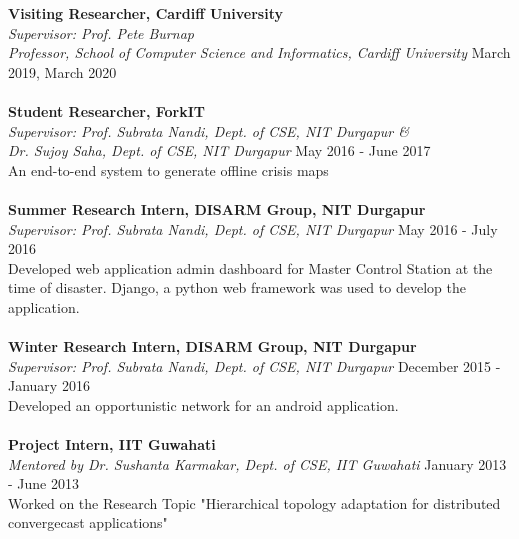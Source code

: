 \documentclass[margin, centered]{res}
\begin{document}
\begin{resume}
\textbf{Visiting Researcher, Cardiff University} \\
\emph{Supervisor: Prof. Pete Burnap \\ Professor, School of Computer Science and Informatics, Cardiff University} \hfill March 2019,  March 2020 \\
\\
\textbf{Student Researcher, ForkIT} \\
\emph{Supervisor: {Prof. Subrata Nandi, Dept. of CSE, NIT Durgapur} \& \\ {Dr. Sujoy Saha, Dept. of CSE, NIT Durgapur}} \hfill May 2016 - June 2017 \\
An end-to-end system to generate offline crisis maps \\
\\
\textbf{Summer Research Intern, DISARM Group, NIT Durgapur} \\
\emph{Supervisor: {Prof. Subrata Nandi, Dept. of CSE, NIT Durgapur}} \hfill May 2016 - July 2016 \\
Developed web application admin dashboard for Master Control Station at the time of disaster. Django, a python web framework was used to develop the application.\\
\\
\textbf{Winter Research Intern, DISARM Group, NIT Durgapur} \\
\emph{Supervisor: {Prof. Subrata Nandi, Dept. of CSE, NIT Durgapur}} \hfill December 2015 - January 2016 \\
Developed an opportunistic network for an android application.
\\
\\
\textbf{Project Intern, IIT Guwahati}  \\
\emph{Mentored by {Dr. Sushanta Karmakar, Dept. of CSE, IIT Guwahati}} \hfill January 2013 - June 2013 \\
Worked on the Research Topic "Hierarchical topology adaptation for distributed convergecast applications"



\end{resume}
\end{document}
